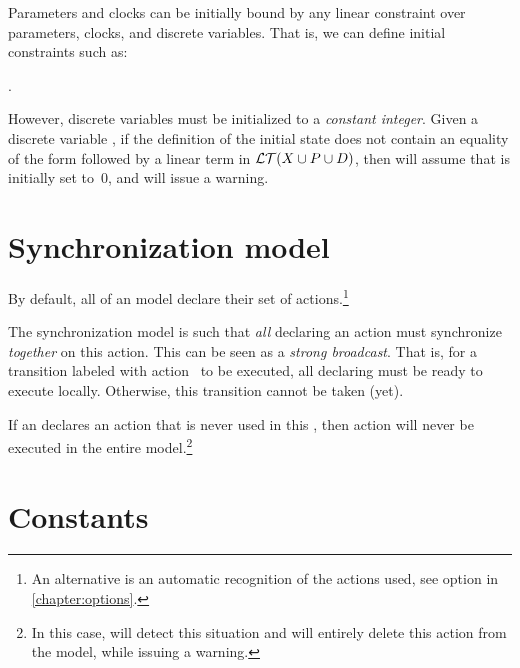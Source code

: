 Parameters and clocks can be initially bound by any linear constraint over parameters, clocks, and discrete variables.
That is, we can define initial constraints such as:
\begin{center}
	.
\end{center}

However, discrete variables must be initialized to a \emph{constant integer}.
Given a discrete variable , if the definition of the initial state does not contain an equality of the form  followed by a linear term in $\mathcal{LT}(X \cup P \cup D)$, then \imitator{} will assume that  is initially set to~0, and will issue a warning.



\section{Synchronization model}\label{sect:synchronization}

By default, all \IPTA{} of an \imitator{} model declare their set of actions.\footnote{%
	An alternative is an automatic recognition of the actions used, see option  in \cref{chapter:options}.
}

The \imitator{} synchronization model is such that \emph{all} \IPTA{} declaring an action must synchronize \emph{together} on this action.
This can be seen as a \emph{strong broadcast}.
That is, for a transition labeled with action~ to be executed, all \IPTA{} declaring  must be ready to execute  locally.
Otherwise, this transition cannot be taken (yet).

If an \IPTA{} declares an action  that is never used in this \IPTA{}, then action  will never be executed in the entire model.\footnote{%
	In this case, \imitator{} will detect this situation and will entirely delete this action from the model, while issuing a warning.
}

\section{Constants}

